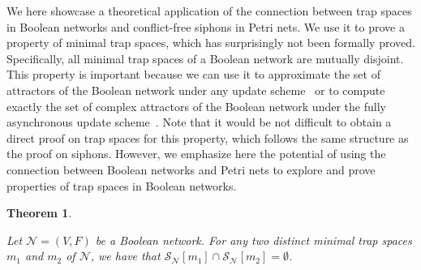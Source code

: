 \documentclass[preprint,12pt]{elsarticle}
\newtheorem{theorem}{Theorem}[section]
\begin{document}
We here showcase a theoretical application of the connection between trap spaces in Boolean networks and conflict-free siphons in Petri nets.
We use it to prove a property of minimal trap spaces, which has surprisingly not been formally proved.
Specifically, all minimal trap spaces of a Boolean network are mutually disjoint.
This property is important because we can use it to approximate the set of attractors of the Boolean network under any update scheme~\cite{klarner2015computing} or to compute exactly the set of complex attractors of the Boolean network under the fully asynchronous update scheme~\cite{DBLP:conf/bcb/TrinhHB22}.
Note that it would be not difficult to obtain a direct proof on trap spaces for this property, which follows the same structure as the proof on siphons.
However, we emphasize here the potential of using the connection between Boolean networks and Petri nets to explore and prove properties of trap spaces in Boolean networks.

\begin{theorem}%
\label{theo:separation_min_ts}

  Let \(\mathcal{N} = (V, F)\) be a Boolean network.
  For any two distinct minimal trap spaces \(m_1\) and \(m_2\) of \(\mathcal{N}\), we have that \(\mathcal{S}_{\mathcal{N}}[m_1] \cap \mathcal{S}_{\mathcal{N}}[m_2] = \emptyset\).

\end{theorem}
\end{document}
